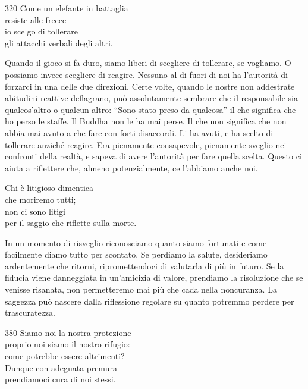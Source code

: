 
\begin{dhpVerse}{320}
\label{dhp-320}
Come un elefante in battaglia\\
resiste alle frecce\\
io scelgo di tollerare\\
gli attacchi verbali degli altri.
\end{dhpVerse}

\begin{dhpRefl}
Quando il gioco si fa duro, siamo liberi di scegliere di tollerare, se vogliamo. O possiamo invece scegliere di reagire. Nessuno al di fuori di noi ha l'autorit\`{a} di forzarci in una delle due direzioni. Certe volte, quando le nostre non addestrate abitudini reattive deflagrano, pu\`{o} assolutamente sembrare che il responsabile sia qualcos'altro o qualcun altro: ``Sono stato preso da qualcosa'' il che significa che ho perso le staffe. Il Buddha non le ha mai perse. Il che non significa che non abbia mai avuto a che fare con forti disaccordi. Li ha avuti, e ha scelto di tollerare anzich\'{e} reagire. Era pienamente consapevole, pienamente sveglio nei confronti della realt\`{a}, e sapeva di avere l'autorit\`{a} per fare quella scelta. Questo ci aiuta a riflettere che, almeno potenzialmente, ce l'abbiamo anche noi.
\end{dhpRefl}


\begin{dhpVerse}{6}
\label{dhp-6}
Chi \`{e} litigioso dimentica\\
che moriremo tutti;\\
non ci sono litigi\\
per il saggio che riflette sulla morte.
\end{dhpVerse}

\begin{dhpRefl}
In un momento di risveglio riconosciamo quanto siamo fortunati e come facilmente diamo tutto per scontato. Se perdiamo la salute, desideriamo ardentemente che ritorni, ripromettendoci di valutarla di più in futuro. Se la fiducia viene danneggiata in un'amicizia di valore, prendiamo la risoluzione che se venisse risanata, non permetteremo mai più che cada nella noncuranza. La saggezza pu\`{o} nascere dalla riflessione regolare su quanto potremmo perdere per trascuratezza.
\end{dhpRefl}


\begin{dhpVerse}{380}
\label{dhp-380}
Siamo noi la nostra protezione\\
proprio noi siamo il nostro rifugio:\\
come potrebbe essere altrimenti?\\
Dunque con adeguata premura\\
prendiamoci cura di noi stessi.
\end{dhpVerse}

